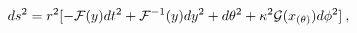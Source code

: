 \begin{equation}
 d s^2 = r^2 [-{\cal F}(y)dt^2+
 {\cal F}^{-1}(y)dy^2+d\theta^2 + \kappa^2{\cal{G}}(x_{(\theta)})d\phi^2]\:,
 \label{dS C-metric}
 \end{equation}

